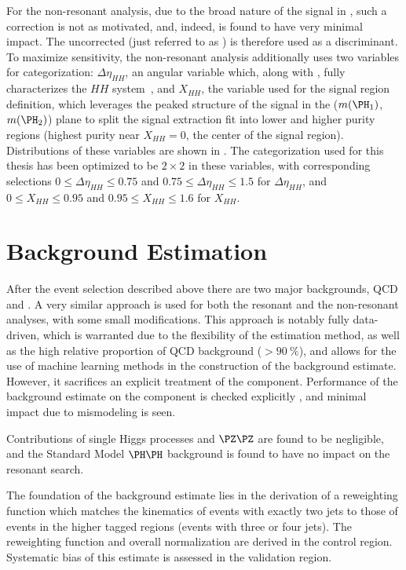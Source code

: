 For the non-resonant analysis, due to the broad nature of the signal in \mhh, such a 
correction is not as motivated, and, indeed, is found to have very minimal 
impact. The uncorrected \mhh (just referred to as \mhh) is therefore used 
as a discriminant. To maximize sensitivity, the non-resonant analysis 
additionally uses two variables for categorization: $\Delta \eta_{HH}$, an angular 
variable which, along with \mhh, fully characterizes the $HH$ system~\cite{cosThetastar}, 
and $X_{HH}$, the variable used for the 
signal region definition, which leverages the peaked structure of the 
signal in the ($\mh1$, $\mh2$) plane to split the signal extraction fit into lower and higher
purity regions (highest purity near $X_{HH} = 0$, the center of the signal region).
Distributions of these variables are shown in . The categorization used for this 
thesis has been optimized to be $2\times 2$ in these variables, with corresponding selections 
$0 \leq \Delta \eta_{HH} \leq 0.75$ and $0.75 \leq \Delta \eta_{HH} \leq 1.5$ for $\Delta \eta_{HH}$, 
and $0 \leq X_{HH} \leq 0.95$ and $0.95 \leq X_{HH} \leq 1.6$ for $X_{HH}$.


\FloatBarrier
\clearpage
\section{Background Estimation}
\label{sec:bkgdestimation}
After the event selection described above there are
two major backgrounds, QCD and \ttbar. A very similar approach is used 
for both the resonant and the non-resonant analyses, with some small modifications. 
This approach is notably fully data-driven, which is warranted due to 
the flexibility of the estimation method, as well as the high relative proportion of 
QCD background ($>90~\%$), and allows for the use of machine learning methods in the construction of
the background estimate. However, it sacrifices an explicit treatment of the
\ttbar component. Performance of the background estimate on the \ttbar component
is checked explicitly , and minimal impact due to \ttbar 
mismodeling is seen.

Contributions of single Higgs processes and $\PZ\PZ$ are found 
to be negligible, and the Standard Model $\higgs\higgs$ background
is found to have no impact on the resonant search.

The foundation of the background estimate lies in the derivation of a
reweighting function which matches the kinematics of events with exactly two
\btagged jets to those of events in the higher tagged regions (events with three or four 
\btagged jets). The reweighting function and overall normalization are derived in 
the control region. Systematic bias of this estimate is assessed in the validation 
region. 


